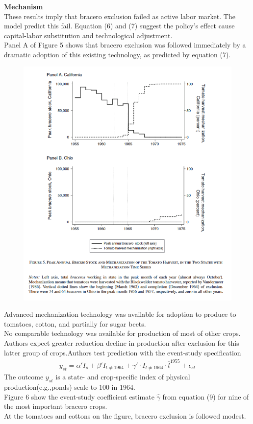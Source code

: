 \documentclass[../root]{subfiles}
\begin{document}
    
    {\bf Mechanism}　\\
    These results imply that bracero exclusion failed as active labor market.
    The model predict this fail. Equation (6) and (7) suggest the policy's effect cause capital-labor substitution and technological adjustment. \\
    Panel A of Figure 5 shows that bracero exclusion was followed immediately by a dramatic adoption of this existing technology, as predicted by equation (7). 
    \begin{figure}
        \centering
        \includegraphics[width = \linewidth]{0731sugiyama/Figure5.png}
        \label{fig:my_label}
    \end{figure}
    Advanced mechanization technology was available for adoption to produce to tomatoes, cotton, and partially for sugar beets. \\
    No comparable technology was available for production of most of other crops. \\
    Authors expect greater reduction decline in production after exclusion for this latter group of crops.Authors test prediction with the event-study specification 
    \begin{align}
        y_{st} = \alpha' I_{s} + \beta'I_{t\neq 1964} +\gamma' \cdot I_{t\neq1964} \cdot \overline{l}^{1955} +\epsilon_{st} 
    \end{align}
    The outcome $y_{st}$ is a state- and crop-specific index of physical production(e.g.,ponds) scale to 100 in 1964.　\\
    Figure 6 show the event-study coefficient estimate $\hat{\gamma}$ from equation (9) for nine of the most important bracero crops.  \\
    At the tomatoes and cottons on the figure, bracero exclusion is followed modest. \\
    
\end{document}

